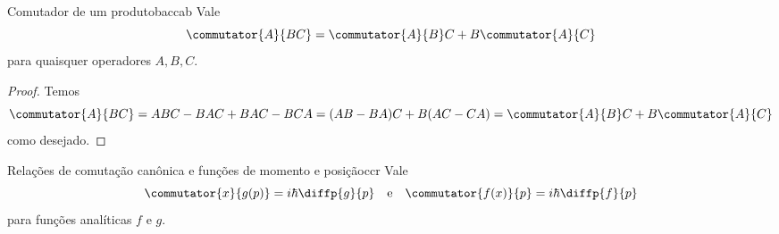 \begin{lemma}{Comutador de um produto}{baccab}
    Vale
    \begin{equation*}
        \commutator{A}{BC} = \commutator{A}{B}C + B \commutator{A}{C}
    \end{equation*}
    para quaisquer operadores \(A, B, C.\)
\end{lemma}
\begin{proof}
    Temos
    \begin{equation*}
        \commutator{A}{BC} = ABC - BAC + BAC - BCA = (AB - BA)C + B(AC - CA) = \commutator{A}{B}C + B\commutator{A}{C}
    \end{equation*}
    como desejado.
\end{proof}
\begin{lemma}{Relações de comutação canônica e funções de momento e posição}{ccr}
    Vale
    \begin{equation*}
        \commutator{x}{g(p)} = i \hbar \diffp{g}{p}
        \quad\text{e}\quad
        \commutator{f(x)}{p} = i \hbar \diffp{f}{p}
    \end{equation*}
    para funções analíticas \(f\) e \(g\).
\end{lemma}
